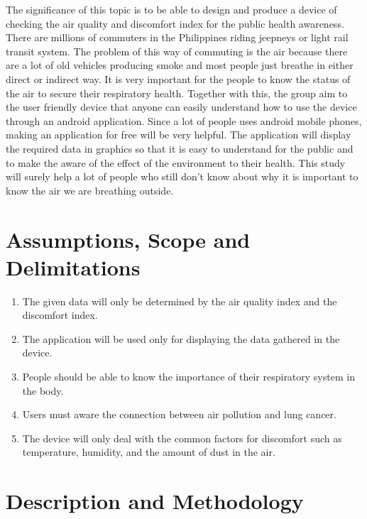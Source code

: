 The significance of this topic is to be able to design and produce a device of checking the air quality and discomfort index for the public health awareness. There are millions of commuters in the Philippines riding jeepneys or light rail transit system. The problem of this way of commuting is the air because there are a lot of old vehicles producing smoke and most people just breathe in either direct or indirect way. It is very important for the people to know the status of the air to secure their respiratory health. Together with this, the group aim to the user friendly device that anyone can easily understand how to use the device through an android application. Since a lot of people uses android mobile phones, making an application for free will be very helpful. The application will display the required data in graphics so that it is easy to understand for the public and to make the aware of the effect of the environment to their health. This study will surely help a lot of people who still don’t know about why it is important to know the air we are breathing outside.


\section{Assumptions, Scope and Delimitations}

\begin{enumerate}
\item The given data will only be determined by the air quality index and the discomfort index.

\item The application will be used only for displaying the data gathered in the device.

\item People should be able to know the importance of their respiratory system in the body.

\item Users must aware the connection between air pollution and lung cancer.

\item The device will only deal with the common factors for discomfort such as temperature, humidity, and the amount of dust in the air.

\end{enumerate}

\section{Description and Methodology}

